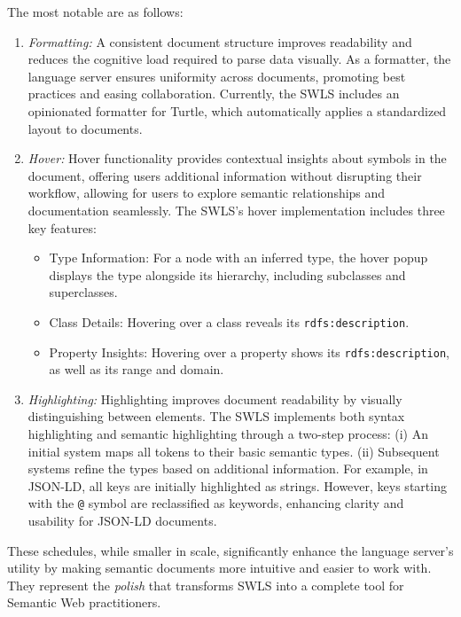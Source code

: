 The most notable are as follows:
\begin{enumerate}
  \item \textit{Formatting:}
    A consistent document structure improves readability and reduces the cognitive load required to parse data visually.
    As a formatter, the language server ensures uniformity across documents, promoting best practices and easing collaboration.
    Currently, the SWLS includes an opinionated formatter for Turtle, which automatically applies a standardized layout to documents.

  \item \textit{Hover:}
    Hover functionality provides contextual insights about symbols in the document, offering users additional information without disrupting their workflow,
    allowing for users to explore semantic relationships and documentation seamlessly.
    The SWLS’s hover implementation includes three key features:
    \begin{itemize}
      \item Type Information: For a node with an inferred type, the hover popup displays the type alongside its hierarchy, including subclasses and superclasses.
      \item Class Details: Hovering over a class reveals its \texttt{rdfs:description}.
      \item Property Insights: Hovering over a property shows its \texttt{rdfs:description}, as well as its range and domain.
    \end{itemize}

  \item \textit{Highlighting:}
    Highlighting improves document readability by visually distinguishing between elements.
    The SWLS implements both syntax highlighting and semantic highlighting through a two-step process:
        (i) An initial system maps all tokens to their basic semantic types.
        (ii) Subsequent systems refine the types based on additional information.
    For example, in JSON-LD, all keys are initially highlighted as strings.
    However, keys starting with the \texttt{@} symbol are reclassified as keywords, enhancing clarity and usability for JSON-LD documents.
\end{enumerate}

These schedules, while smaller in scale, significantly enhance the language server’s utility by making semantic documents more intuitive and easier to work with.
They represent the \textit{polish} that transforms SWLS into a complete tool for Semantic Web practitioners.
